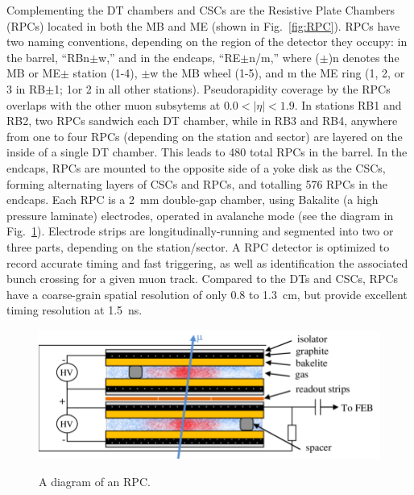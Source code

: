 
Complementing the DT chambers and CSCs are the Resistive Plate Chambers (RPCs) located in both the MB and ME (shown in Fig.~\ref{fig:RPC}). RPCs have two naming conventions, depending on the region of the detector they occupy: in the barrel, ``RBn$\pm$w,'' and in the endcaps, ``RE$\pm$n/m,'' where ($\pm$)n denotes the MB or ME$\pm$ station (1-4), $\pm$w the MB wheel (1-5), and m the ME ring (1, 2, or 3 in RB$\pm$1; 1or 2 in all other stations). Pseudorapidity coverage by the RPCs overlaps with the other muon subsytems at $0.0 < |\eta| < 1.9$. In stations RB1 and RB2, two RPCs sandwich each DT chamber, while in RB3 and RB4, anywhere from one to four RPCs (depending on the station and sector) are layered on the inside of a single DT chamber. This leads to 480 total RPCs in the barrel. In the endcaps, RPCs are mounted to the opposite side of a yoke disk as the CSCs, forming alternating layers of CSCs and RPCs, and totalling 576 RPCs in the endcaps. Each RPC is a \SI{2}{mm} double-gap chamber, using Bakalite (a high pressure laminate) electrodes, operated in avalanche mode (see the diagram in Fig.~\ref{fig:RPCDiagram}). Electrode strips are longitudinally-running and segmented into two or three parts, depending on the station/sector. A RPC detector is optimized to record accurate timing and fast triggering, as well as identification the associated bunch crossing for a given muon track. Compared to the DTs and CSCs, RPCs have a coarse-grain spatial resolution of only 0.8 to \SI{1.3}{\cm}, but provide excellent timing resolution at \SI{1.5}{\ns}.

\begin{figure}[H]
    \centering
    {\includegraphics[width=\textwidth]{Images/CMS/RPCDiagram.png}}
    \caption{A diagram of an RPC.}
    \label{fig:RPCDiagram}
\end{figure}


